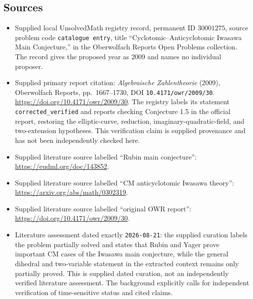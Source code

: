 \documentclass[11pt]{article}
\begin{document}
\subsection{Sources}
\begin{itemize}
\item Supplied local UnsolvedMath registry record, permanent ID \(30001275\), source problem code \texttt{catalogue entry}, title ``Cyclotomic--Anticyclotomic Iwasawa Main Conjecture,'' in the Oberwolfach Reports Open Problems collection. The record gives the proposed year as 2009 and names no individual proposer.
\item Supplied primary report citation: \emph{Algebraische Zahlentheorie} (2009), Oberwolfach Reports, pp.\ 1667--1730, DOI \texttt{10.4171/owr/2009/30}. \url{https://doi.org/10.4171/owr/2009/30}. The registry labels its statement \texttt{corrected\_verified} and reports checking Conjecture 1.5 in the official report, restoring the elliptic-curve, reduction, imaginary-quadratic-field, and two-extension hypotheses. This verification claim is supplied provenance and has not been independently checked here.
\item Supplied literature source labelled ``Rubin main conjecture'': \url{https://eudml.org/doc/143852}.
\item Supplied literature source labelled ``CM anticyclotomic Iwasawa theory'': \url{https://arxiv.org/abs/math/0302319}.
\item Supplied literature source labelled ``original OWR report'': \url{https://doi.org/10.4171/owr/2009/30}.
\item Literature assessment dated exactly \texttt{2026-08-21}: the supplied curation labels the problem partially solved and states that Rubin and Yager prove important CM cases of the Iwasawa main conjecture, while the general dihedral and two-variable statement in the extracted context remains only partially proved. This is supplied dated curation, not an independently verified literature assessment. The background explicitly calls for independent verification of time-sensitive status and cited claims.
\end{itemize}
\end{document}
